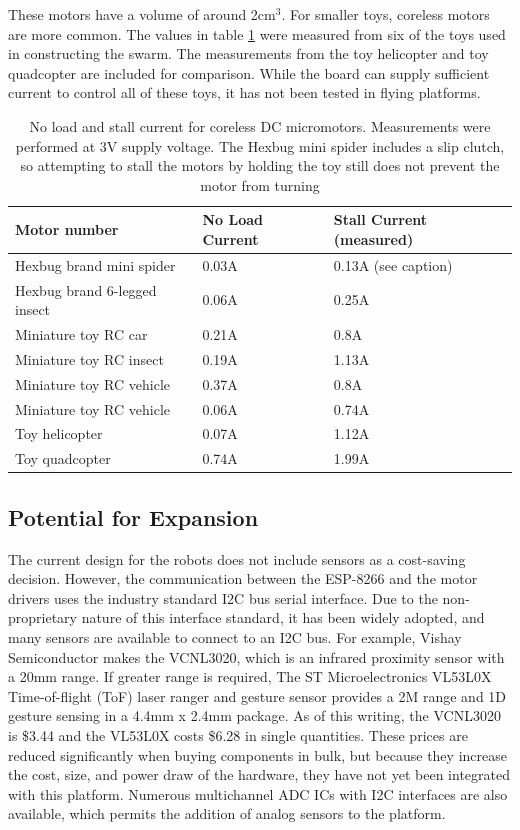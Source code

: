 These motors have a volume of around 2cm$^3$.
For smaller toys, coreless motors are more common. 
The values in table \ref{tab:coreless} were measured from six of the toys used in constructing the swarm.
The measurements from the toy helicopter and toy quadcopter are included for comparison.
While the board can supply sufficient current to control all of these toys, it has not been tested in flying platforms.

\begin{table}
	\begin{tabular}{l l l}
		Motor number & No Load Current & Stall Current (measured)\\
		\hline 
		Hexbug brand mini spider & 0.03A & 0.13A (see caption) \\
		Hexbug brand 6-legged insect & 0.06A & 0.25A \\
		Miniature toy RC car & 0.21A & 0.8A \\
		Miniature toy RC insect & 0.19A & 1.13A \\
		Miniature toy RC vehicle & 0.37A & 0.8A \\
		Miniature toy RC vehicle & 0.06A & 0.74A \\
		Toy helicopter & 0.07A & 1.12A \\
		Toy quadcopter & 0.74A & 1.99A \\
	\end{tabular}
	\caption{No load and stall current for coreless DC micromotors. Measurements were performed at 3V supply voltage. The Hexbug mini spider includes a slip clutch, so attempting to stall the motors by holding the toy still does not prevent the motor from turning}
	\label{tab:coreless}
\end{table}


\subsection{Potential for Expansion} \label{section:Potential_for_Expansion}

The current design for the robots does not include sensors as a cost-saving decision. 
However, the communication between the ESP-8266 and the motor drivers uses the industry standard I2C bus serial interface. 
Due to the non-proprietary nature of this interface standard, it has been widely adopted, and many sensors are available to connect to an I2C bus. 
For example, Vishay Semiconductor makes the VCNL3020, which is an infrared proximity sensor with a 20mm range. 
If greater range is required, The ST Microelectronics VL53L0X Time-of-flight (ToF) laser ranger and gesture sensor provides a 2M range and 1D gesture sensing in a 4.4mm x 2.4mm package. 
As of this writing, the VCNL3020 is \$3.44 and the VL53L0X costs \$6.28 in single quantities.
These prices are reduced significantly when buying components in bulk, but because they increase the cost, size, and power draw of the hardware, they have not yet been integrated with this platform. 
Numerous multichannel ADC ICs with I2C interfaces are also available, which permits the addition of analog sensors to the platform. 

